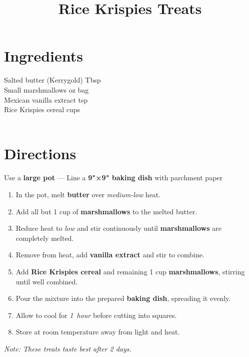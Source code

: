 \documentclass[11pt,letterpaper]{article}
\title{Rice Krispies Treats}
\author{}
\date{}
\begin{document}
\maketitle
\thispagestyle{empty}

\section*{Ingredients}
\setlength{\columnsep}{20pt}
\begin{multicols}{2}
\noindent
    Salted butter (Kerrygold)  Tbsp \\
    Small marshmallows  oz bag \\
    Mexican vanilla extract  tsp \\
    Rice Krispies cereal  cups \\
    \columnbreak
    \\
\end{multicols}

\section*{Directions}

\noindent
Use a \textbf{large pot} ---
Line a \textbf{9"×9" baking dish} with parchment paper

\begin{enumerate}
    \item In the pot, melt \textbf{butter} over \textit{medium-low} heat.
    \item Add all but 1 cup of \textbf{marshmallows} to the melted butter.
    \item Reduce heat to \textit{low} and stir continuously until \textbf{marshmallows} are completely melted.
    \item Remove from heat, add \textbf{vanilla extract} and stir to combine.
    \item Add \textbf{Rice Krispies cereal} and remaining 1 cup \textbf{marshmallows}, stirring until well combined.
    \item Pour the mixture into the prepared \textbf{baking dish}, spreading it evenly.
    \item Allow to cool for \textit{1~hour} before cutting into squares.
    \item Store at room temperature away from light and heat.
\end{enumerate}

\noindent
\textit{Note: These treats taste best after 2 days.}
\end{document}
